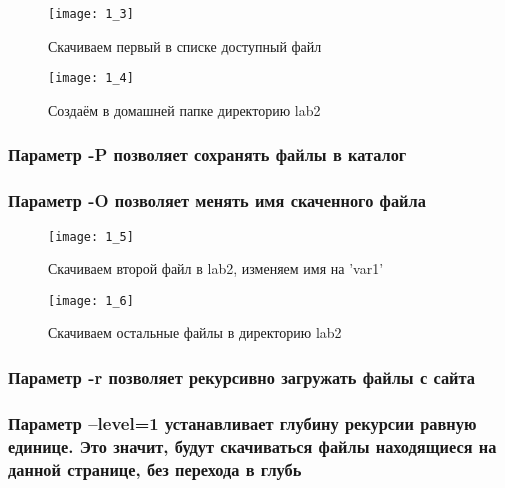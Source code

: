 \begin{figure}[H]
	\begin{center}
		\texttt{[image: 1\_3]}
		\caption{Скачиваем первый в списке доступный файл} 
		\label{pic:pic_1} %
	\end{center}
\end{figure}

\begin{figure}[H]
	\begin{center}
		\texttt{[image: 1\_4]}
		\caption{Создаём в домашней папке директорию lab2} 
		\label{pic:pic_1} %
	\end{center}
\end{figure}
 
\subsubsection{Параметр -P позволяет сохранять файлы в каталог}
\subsubsection{Параметр -O позволяет менять имя скаченного файла}

\begin{figure}[H]
	\begin{center}
		\texttt{[image: 1\_5]}
		\caption{Скачиваем второй файл в lab2, изменяем имя на 'var1'} 
		\label{pic:pic_1} %
	\end{center}
\end{figure} 
 
\begin{figure}[H]
	\begin{center}
		\texttt{[image: 1\_6]}
		\caption{Скачиваем остальные файлы в директорию lab2} 
		\label{pic:pic_1} %
	\end{center}
\end{figure}

\subsubsection{Параметр -r позволяет рекурсивно загружать файлы с сайта}
\subsubsection{Параметр --level=1 устанавливает глубину рекурсии равную единице. Это значит, будут скачиваться файлы находящиеся на данной странице, без перехода в глубь}
